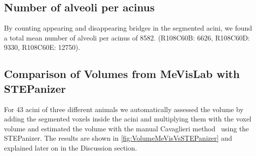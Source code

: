 \documentclass[twoside,paper=a4,abstract=true,english,DIV=calc]{scrartcl}
\newcommand{\numberofacini}{43}
\newcommand{\meannumberofalveoli}{8582} %
\begin{document}
\subsection{Number of alveoli per acinus}
By counting appearing and disappearing bridges in the segmented acini, we found a total mean number of alveoli per acinus of \meannumberofalveoli. (R108C60B: 6626, R108C60D: 9330, R108C60E: 12750).

\subsection{Comparison of Volumes from MeVisLab with STEPanizer}
For \numberofacini\xspace acini of three different animals we automatically assessed the volume by adding the segmented voxels inside the acini and multiplying them with the voxel volume and estimated the volume with the manual Cavaglieri method~\cite{Hsia2010} using the STEPanizer.
The results are shown in \autoref{fig:VolumeMeVisVsSTEPanizer} and explained later on in the Discussion section.
\end{document}
